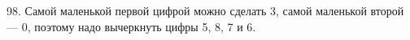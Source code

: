 98. Самой маленькой первой цифрой можно сделать 3, самой маленькой второй --- 0, поэтому надо вычеркнуть цифры 5, 8, 7 и 6.\\
